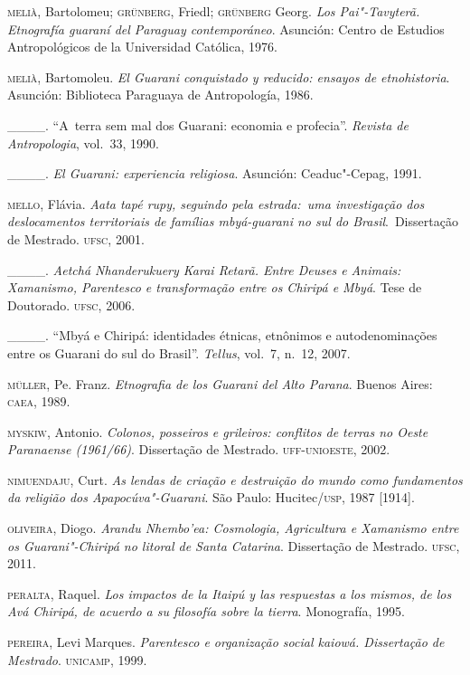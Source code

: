 \begin{Parskip}
\textsc{melià}, Bartolomeu; \textsc{grünberg}, Friedl; \textsc{grünberg} Georg. \emph{Los Pai"-Tavyterã.
Etnografía guaraní del Paraguay contemporáneo}. Asunción: Centro de
Estudios Antropológicos de la Universidad Católica, 1976.

\textsc{melià}, Bartomoleu. \emph{El Guarani conquistado y reducido: ensayos de
etnohistoria}. Asunción: Biblioteca Paraguaya de Antropología, 1986.

\_\_\_\_. ``A~terra sem mal dos Guarani: economia e profecia''. \emph{Revista de
Antropologia}, vol.~33, 1990. 

\_\_\_\_. \emph{El Guarani: experiencia religiosa}. Asunción: Ceaduc"-Cepag, 1991.

\textsc{mello}, Flávia. \emph{Aata tapé rupy, seguindo pela estrada:~uma
investigação dos deslocamentos territoriais de famílias mbyá-guarani no
sul do Brasil}.~Dissertação de Mestrado. \textsc{ufsc}, 2001.

\_\_\_\_. \emph{Aetchá Nhanderukuery Karai Retarã. Entre Deuses e Animais:
Xamanismo, Parentesco e transformação entre os Chiripá e Mbyá}. Tese de
Doutorado. \textsc{ufsc}, 2006. 

\_\_\_\_. ``Mbyá e Chiripá: identidades étnicas, etnônimos e autodenominações
entre os Guarani do sul do Brasil''. \emph{Tellus}, vol.~7, n.~12, 2007.

\textsc{müller}, Pe. Franz. \emph{Etnografia de los Guarani del Alto Parana}. Buenos
Aires: \textsc{caea}, 1989.

\textsc{myskiw}, Antonio. \emph{Colonos, posseiros e grileiros: conflitos de
terras no Oeste Paranaense (1961/66)}. Dissertação de Mestrado.
\textsc{uff}-\textsc{unioeste}, 2002.

\textsc{nimuendaju}, Curt. \emph{As lendas de criação e destruição do mundo como
fundamentos da religião dos Apapocúva"-Guarani}. São Paulo: Hucitec/\textsc{usp},
1987 [1914].

\textsc{oliveira}, Diogo. \emph{Arandu Nhembo’ea: Cosmologia, Agricultura e Xamanismo
entre os Guarani"-Chiripá no litoral de Santa Catarina}. Dissertação de
Mestrado. \textsc{ufsc}, 2011.

\textsc{peralta}, Raquel. \emph{Los impactos de la Itaipú y las respuestas a los
mismos, de los Avá Chiripá, de acuerdo a su filosofía sobre la tierra}.
Monografía, 1995.

\textsc{pereira}, Levi Marques. \emph{Parentesco e organização social kaiowá.
Dissertação de Mestrado}. \textsc{unicamp}, 1999.


\end{Parskip}
